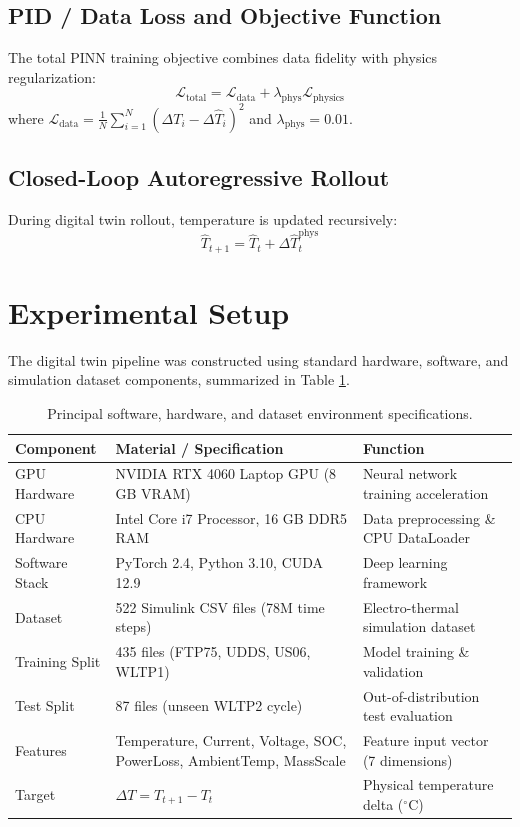 \documentclass[12pt,a4paper]{article}
\begin{document}
\subsection{PID / Data Loss and Objective Function}
The total PINN training objective combines data fidelity with physics regularization:
\begin{equation}
\mathcal{L}_{\text{total}} = \mathcal{L}_{\text{data}} + \lambda_{\text{phys}} \mathcal{L}_{\text{physics}}
\label{eq:loss_total}
\end{equation}
where $\mathcal{L}_{\text{data}} = \frac{1}{N} \sum_{i=1}^N (\Delta T_i - \Delta \hat{T}_i)^2$ and $\lambda_{\text{phys}} = 0.01$.

\subsection{Closed-Loop Autoregressive Rollout}
During digital twin rollout, temperature is updated recursively:
\begin{equation}
\hat{T}_{t+1} = \hat{T}_t + \Delta \hat{T}_t^{\text{phys}}
\label{eq:rollout_step}
\end{equation}

\section{Experimental Setup}
The digital twin pipeline was constructed using standard hardware, software, and simulation dataset components, summarized in Table \ref{tab:materials}.

\begin{table}[h]
\centering
\caption{Principal software, hardware, and dataset environment specifications.}
\label{tab:materials}
\begin{tabularx}{\textwidth}{@{}l p{5.2cm} X@{}}
\toprule
Component & Material / Specification & Function \\
\midrule
GPU Hardware & NVIDIA RTX 4060 Laptop GPU (8 GB VRAM) & Neural network training acceleration \\
CPU Hardware & Intel Core i7 Processor, 16 GB DDR5 RAM & Data preprocessing \& CPU DataLoader \\
Software Stack & PyTorch 2.4, Python 3.10, CUDA 12.9 & Deep learning framework \\
Dataset & 522 Simulink CSV files (78M time steps) & Electro-thermal simulation dataset \\
Training Split & 435 files (FTP75, UDDS, US06, WLTP1) & Model training \& validation \\
Test Split & 87 files (unseen WLTP2 cycle) & Out-of-distribution test evaluation \\
Features & Temperature, Current, Voltage, SOC, PowerLoss, AmbientTemp, MassScale & Feature input vector (7 dimensions) \\
Target & $\Delta T = T_{t+1} - T_t$ & Physical temperature delta ($^\circ\text{C}$) \\
\bottomrule
\end{tabularx}
\end{table}
\end{document}
